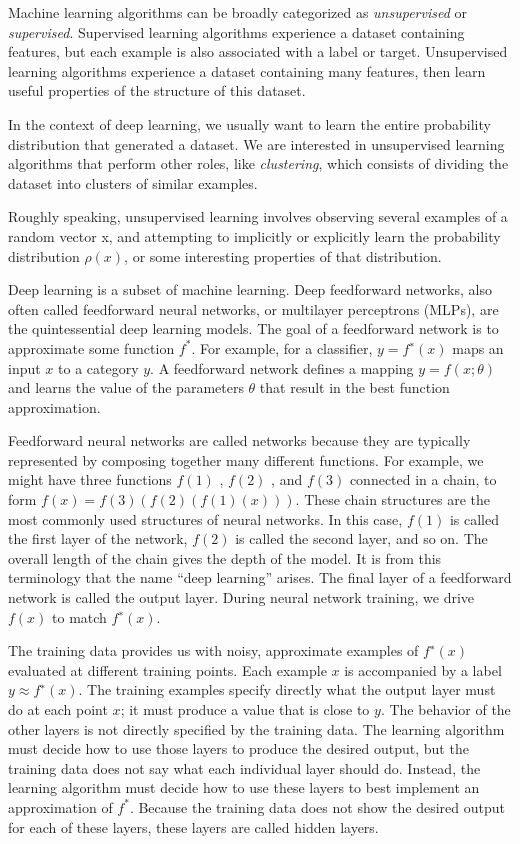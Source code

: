 Machine learning algorithms can be broadly categorized as \textit{unsupervised} or \textit{supervised}. Supervised learning algorithms experience a dataset containing features, but each example is also associated with a label or target. Unsupervised learning algorithms experience a dataset containing many features, then learn useful properties of the structure of this dataset. 

In the context of deep learning, we usually want to learn the entire probability distribution that generated a dataset. We are interested in unsupervised learning algorithms that perform other roles, like \textit{clustering}, which consists of dividing the dataset into clusters of similar examples.

Roughly speaking, unsupervised learning involves observing several examples of a random vector x, and attempting to implicitly or explicitly learn the probability distribution $\rho(x)$, or some interesting properties of that distribution.

Deep learning is a subset of machine learning. Deep feedforward networks, also often called feedforward neural networks,
or multilayer perceptrons (MLPs), are the quintessential deep learning models. The goal of a feedforward network is to approximate some function $f^*$. For example, for a classiﬁer, $y = f^∗(x)$ maps an input $x$ to a category $y$. A feedforward network deﬁnes a mapping $y=f(x; \theta)$ and learns the value of the parameters $\theta$ that result in the best function approximation. 

Feedforward neural networks are called networks because they are typically represented by composing together many diﬀerent functions. For example, we might have three functions $f(1)$ , $f(2)$ , and $f(3)$ connected in a chain, to form $f(x)=f(3) (f(2)(f(1)(x)))$. These chain structures are the most commonly used structures of neural networks. In this case, $f(1)$ is called the ﬁrst layer of the network, $f(2)$ is called the second layer, and so on. The overall length of the chain gives the depth of the model. It is from this terminology that the name “deep learning” arises. The ﬁnal layer of a feedforward network is called the output layer. During neural network training, we drive $f(x)$ to match $f^∗(x)$.

The training data provides us with noisy, approximate examples of $f^∗(x)$ evaluated at diﬀerent training points. Each example $x$ is accompanied by a label $y\approx f^∗(x)$. The training examples specify directly what the output layer must do at each point $x$; it must produce a value that is close to $y$. The behavior of the other layers is not directly speciﬁed by the training data. The learning algorithm must decide how to use those layers to produce the desired output, but the training data does not say what each individual layer should do. Instead, the learning algorithm must decide how to use these layers to best implement an approximation of $f^*$. Because the training data does not show the desired output for each of these layers, these layers are called hidden layers.

